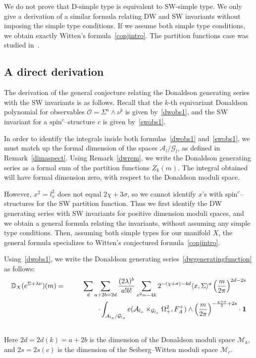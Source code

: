\documentclass[a4paper,12pt,reqno,sumlimits]{amsart}
\theoremstyle{plain}
\theoremstyle{definition}
\newcommand{\D}{{\mathbb D}}
\newcommand{\1}{{\bf 1}}
\newcommand{\calA}{{\mathcal A}}
\newcommand{\calG}{{\mathcal G}}
\newcommand{\calM}{{\mathcal M}}
\newcommand{\calO}{{\mathcal O}}
\newcommand{\spinc}{$\text{spin}^c$}
\newcommand{\ip}[1]{\langle #1 \rangle}
\numberwithin{equation}{section}
\begin{document}
We do not prove that D-simple type is equivalent to SW-simple type. We only
give a derivation of a similar formula relating DW and SW invariants without
imposing the simple type conditions. If we assume both simple type
conditions, we obtain exactly Witten's formula~\eqref{conjintro}.  The
partition functions case was studied in~\cite{vajiac}.


\subsection{A direct derivation}

The derivation of the general conjecture relating the Donaldson generating
series with the SW invariants is as follows.  Recall that the $k$-th
equivariant Donaldson polynomial for observables $\calO=\Sigma^a\wedge\nu^b$
is given by~\eqref{dwobs1}, and the SW invariant for a \spinc--structure $c$
is given by~\eqref{swobs1}. 

In order to identify the integrals inside both formulas~\eqref{dwobs1}
and~\eqref{swobs1}, we must match up the formal dimension of the spaces
$\calA_{l}/\calG_{l}$, as defined in Remark~\ref{dimaspect}.  Using
Remark~\ref{dwrem}, we write the Donaldson generating series as a formal sum
of the partition functions $Z_k(m)$. The integral obtained will have formal
dimension zero, with respect to the Donaldson moduli space.  

However, $x^2=l_x^2$ does not equal $2\chi+3\sigma$, so we cannot identify
$x$'s with \spinc--structures for the SW partition function. Thus we first
identify the DW generating series with SW invariants for positive dimension
moduli spaces, and we obtain a general formula relating the invariants,
without assuming any simple type conditions.  Then, assuming both simple
types for our manifold $X$, the general formula specializes to Witten's
conjectured formula~\eqref{conjintro}.

Using~\eqref{dwobs1}, we write the Donaldson generating
series~\eqref{dwgeneratingfunction} as follows:
\begin{eqnarray}
  \label{bebe}
  \D_X(e^{\Sigma+\lambda\nu})(m) &=&\sum_d\sum_{a+2b=2d}\frac{(2\lambda)^{b}}{a!b!}
  \sum_{x^2=-4k} 2^{-(\chi+\sigma)-4d}\ip{x,\Sigma}^{a}
  \left(\frac{m}{2\pi}\right)^{2d-2s}\nonumber\\
  &&\qquad\qquad\cdot\int_{\calA_{l_x}/\calG_{l_x}} 
  e(\calA_{l_x}\times_{\calG_{l_x}}\Omega^2_+,F_A^+)\wedge
  \left(\frac{m}{2\pi}\right)^{-\frac{\chi+\sigma}{2}+2s}\cdot\1\nonumber\\
  \,
\end{eqnarray}
Here $2d=2d(k)=a+2b$ is the dimension of the Donaldson moduli space
$\calM_k$, and $2s=2s(c)$ is the dimension of the Seiberg--Witten moduli
space $\calM_c$.
\end{document}
